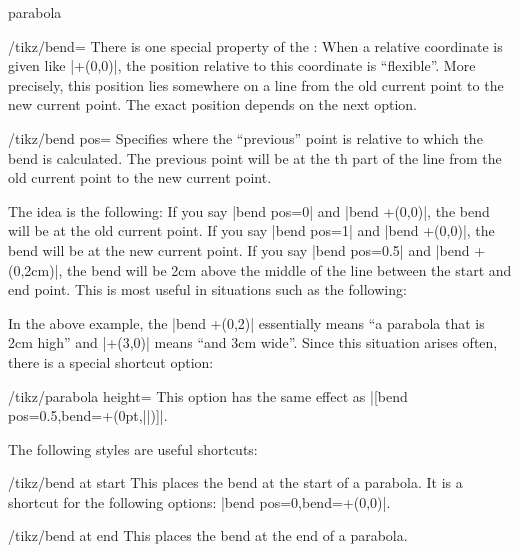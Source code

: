 \begin{pathoperation}{parabola}{}
\begin{key}{/tikz/bend=}
        There is one special property of the : When a relative
        coordinate is given like |+(0,0)|, the position relative to this
        coordinate is ``flexible''. More precisely, this position lies
        somewhere on a line from the old current point to the new current
        point. The exact position depends on the next option.
    \end{key}

    \begin{key}{/tikz/bend pos=}
        Specifies where the ``previous'' point is relative to which the bend is
        calculated. The previous point will be at the th part of
        the line from the old current point to the new current point.

        The idea is the following: If you say |bend pos=0| and |bend +(0,0)|,
        the bend will be at the old current point. If you say |bend pos=1| and
        |bend +(0,0)|, the bend will be at the new current point. If you say
        |bend pos=0.5| and |bend +(0,2cm)|, the bend will be 2cm above the
        middle of the line between the start and end point. This is most useful
        in situations such as the following:
\begin{codeexample}[]
\end{codeexample}

        In the above example, the |bend +(0,2)| essentially means ``a parabola
        that is 2cm high'' and |+(3,0)| means ``and 3cm wide''. Since this
        situation arises often, there is a special shortcut option:
        \begin{key}{/tikz/parabola height=}
            This option has the same effect as
            |[bend pos=0.5,bend={+(0pt,||)}]|.
\begin{codeexample}[]
\end{codeexample}
        \end{key}
    \end{key}

    The following styles are useful shortcuts:
    \begin{stylekey}{/tikz/bend at start}
        This places the bend at the start of a parabola. It is a shortcut for
        the following options: |bend pos=0,bend={+(0,0)}|.
    \end{stylekey}

    \begin{stylekey}{/tikz/bend at end}
        This places the bend at the end of a parabola.
    \end{stylekey}
\end{pathoperation}


